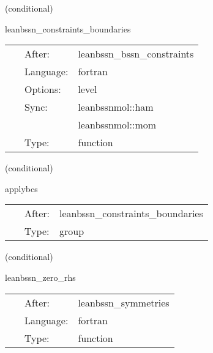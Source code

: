    (conditional) 

\hspace{5mm} leanbssn\_constraints\_boundaries 

\hspace{5mm}{\it enforce symmetry bcs in constraint computation } 


\hspace{5mm}

 \begin{tabular*}{160mm}{cll} 
~ & After:  & leanbssn\_bssn\_constraints \\ 
~ & Language:  & fortran \\ 
~ & Options:  & level \\ 
~ & Sync:  & leanbssnmol::ham \\ 
~& ~ &leanbssnmol::mom\\ 
~ & Type:  & function \\ 
\end{tabular*} 


\vspace{5mm}

   (conditional) 

\hspace{5mm} applybcs 

\hspace{5mm}{\it apply boundary conditions } 


\hspace{5mm}

 \begin{tabular*}{160mm}{cll} 
~ & After:  & leanbssn\_constraints\_boundaries \\ 
~ & Type:  & group \\ 
\end{tabular*} 


\vspace{5mm}

   (conditional) 

\hspace{5mm} leanbssn\_zero\_rhs 

\hspace{5mm}{\it set all rhs functions to zero to prevent spurious nans } 


\hspace{5mm}

 \begin{tabular*}{160mm}{cll} 
~ & After:  & leanbssn\_symmetries \\ 
~ & Language:  & fortran \\ 
~ & Type:  & function \\ 
\end{tabular*} 


